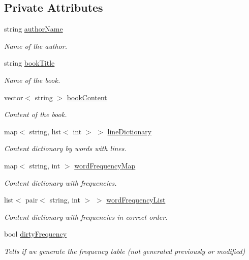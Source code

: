 \subsection*{Private Attributes}
\begin{DoxyCompactItemize}
\item 
string \hyperlink{class_book_a0dcb8f78ffb56c34e28f5d672b422e2a}{author\+Name}
\begin{DoxyCompactList}\small\item\em Name of the author. \end{DoxyCompactList}\item 
string \hyperlink{class_book_a111d7b30bddd6166bd09764f050cfee3}{book\+Title}
\begin{DoxyCompactList}\small\item\em Name of the book. \end{DoxyCompactList}\item 
vector$<$ string $>$ \hyperlink{class_book_a62ca3f4431b699fa41384c8bab7ef4fa}{book\+Content}
\begin{DoxyCompactList}\small\item\em Content of the book. \end{DoxyCompactList}\item 
map$<$ string, list$<$ int $>$ $>$ \hyperlink{class_book_a7da5c2f5239458c2ab88576cac8d0a10}{line\+Dictionary}
\begin{DoxyCompactList}\small\item\em Content dictionary by words with lines. \end{DoxyCompactList}\item 
map$<$ string, int $>$ \hyperlink{class_book_a18b73c8d2b492cad5b7b0c187b08dfc0}{word\+Frequency\+Map}
\begin{DoxyCompactList}\small\item\em Content dictionary with frequencies. \end{DoxyCompactList}\item 
list$<$ pair$<$ string, int $>$ $>$ \hyperlink{class_book_aa9035db1c21cf61eb3af84ad69829069}{word\+Frequency\+List}
\begin{DoxyCompactList}\small\item\em Content dictionary with frequencies in correct order. \end{DoxyCompactList}\item 
bool \hyperlink{class_book_ad1df1050750f0605efdfab51b86c0765}{dirty\+Frequency}
\begin{DoxyCompactList}\small\item\em Tells if we generate the frequency table (not generated previously or modified) \end{DoxyCompactList}\item 

\end{DoxyCompactItemize}
